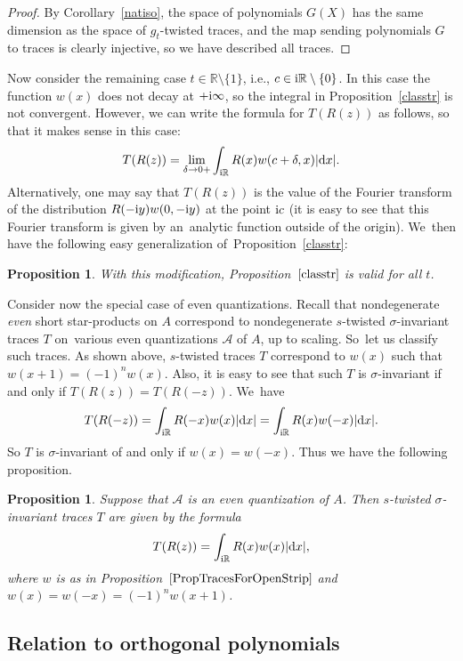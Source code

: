 \documentclass[pdftex]{sigma}
\newcommand{\RN}{\mathbb{R}} %
\newcommand{\mc}[1]{\mathcal{#1}}
\newtheorem{Proposition}[Theorem]{Proposition}
\theoremstyle{definition}
\numberwithin{equation}{section}
\begin{document}
\begin{proof}
By Corollary~\ref{natiso}, the space of polynomials $G(X)$ has the same dimension as the space of $g_t$-twisted traces, and the map sending polynomials $G$ to traces is clearly injective, so we have described all traces.
\end{proof}

Now consider the remaining case $t\in \mathbb R\setminus \lbrace 1\rbrace$, i.e., $c\in {\rm i}\mathbb R\setminus \lbrace 0\rbrace$. In this case the function $w(x)$ does not decay at $+{\rm i}\infty$, so the integral in Proposition~\ref{classtr} is not convergent. However, we can write the formula for $T(R(z))$ as follows, so that it makes sense in this case:
\[
T(R(z))=\lim_{\delta\to 0+}\int_{{\rm i}\RN} R(x)w(c+\delta,x)|{\rm d}x|.
\]
Alternatively, one may say that
$T(R(z))$ is the value of the Fourier transform of the distribution
$R(-{\rm i}y)w(0,-{\rm i}y)$ at the point ${\rm i}c$ (it is easy to see that this Fourier transform is given by an~analytic function outside of the origin). We~then have the following easy generalization of~Proposition~\ref{classtr}:

\begin{Proposition} With this modification, Proposition~$\ref{classtr}$ is valid for all $t$.
\end{Proposition}

Consider now the special case of even quantizations.
Recall \cite[Section~3.3]{ES} that nondegenerate {\it even} short star-products on $A$ correspond to nondegenerate $s$-twisted $\sigma$-invariant traces $T$ on~various even quantizations $\mc A$ of $A$, up to scaling. So~let us classify such traces. As shown above, $s$-twisted traces $T$ correspond to $w(x)$ such that $w(x+1)=(-1)^n w(x)$. Also, it is easy to see that such $T$ is $\sigma$-invariant if and only if $T(R(z))=T(R(-z))$. We~have
\[
T(R(-z))=\int_{{\rm i}\RN} R(-x)w(x) |{\rm d}x|=\int_{{\rm i}\RN} R(x)w(-x) |{\rm d}x|.
\]
So $T$ is $\sigma$-invariant of and only if $w(x)=w(-x)$. Thus we have the following proposition.

\begin{Proposition}
Suppose that $\mc{A}$ is an even quantization of $A$. Then $s$-twisted $\sigma$-invariant traces $T$ are given by the formula
\[
T(R(z))=\int_{{\rm i}\RN} R(x)w(x)|{\rm d}x|,
\]
where $w$ is as in Proposition~$\ref{PropTracesForOpenStrip}$ and
$w(x)=w(-x)=(-1)^n w(x+1)$.
\end{Proposition}

\subsection{Relation to orthogonal polynomials}\label{ortpol}
\end{document}
